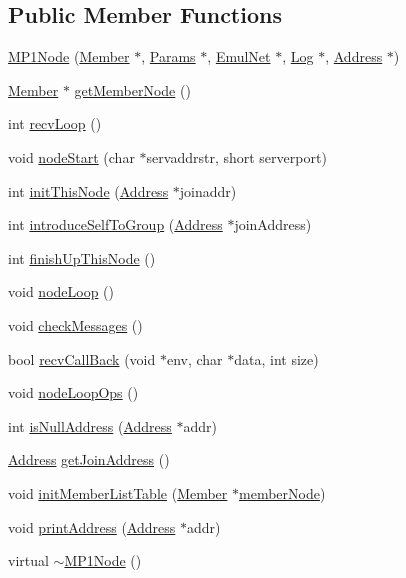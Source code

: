 \subsection*{\-Public \-Member \-Functions}
\begin{DoxyCompactItemize}
\item 
\hyperlink{class_m_p1_node_a7ee5f216f4d59ee4e80028f346a71e80}{\-M\-P1\-Node} (\hyperlink{class_member}{\-Member} $\ast$, \hyperlink{class_params}{\-Params} $\ast$, \hyperlink{class_emul_net}{\-Emul\-Net} $\ast$, \hyperlink{class_log}{\-Log} $\ast$, \hyperlink{class_address}{\-Address} $\ast$)
\item 
\hyperlink{class_member}{\-Member} $\ast$ \hyperlink{class_m_p1_node_acf056a183e4db1b8290ff736f8ced409}{get\-Member\-Node} ()
\item 
int \hyperlink{class_m_p1_node_a61c78c68e9033a5ff52c3fc2e1a3982b}{recv\-Loop} ()
\item 
void \hyperlink{class_m_p1_node_a432c95b8d9ff4d689bf6f670884639a8}{node\-Start} (char $\ast$servaddrstr, short serverport)
\item 
int \hyperlink{class_m_p1_node_ae2b5a0e2ffd68532ab68a1f17853cf6e}{init\-This\-Node} (\hyperlink{class_address}{\-Address} $\ast$joinaddr)
\item 
int \hyperlink{class_m_p1_node_ad020c60f48dec0571ce9a744540effbd}{introduce\-Self\-To\-Group} (\hyperlink{class_address}{\-Address} $\ast$join\-Address)
\item 
int \hyperlink{class_m_p1_node_a707677bbd17a3cf3d441f0ab08dab6b7}{finish\-Up\-This\-Node} ()
\item 
void \hyperlink{class_m_p1_node_a5580b634a7656f04db9d819d0b722712}{node\-Loop} ()
\item 
void \hyperlink{class_m_p1_node_a4fe0fab29863fb7de566e9361272d0ad}{check\-Messages} ()
\item 
bool \hyperlink{class_m_p1_node_ac04abd96cbe4d9c34cb9b1b775b82511}{recv\-Call\-Back} (void $\ast$env, char $\ast$data, int size)
\item 
void \hyperlink{class_m_p1_node_a1dcede441149fb1dc09b0ef9cf715ca8}{node\-Loop\-Ops} ()
\item 
int \hyperlink{class_m_p1_node_aa602659d4955d5656fac098d6caf43a9}{is\-Null\-Address} (\hyperlink{class_address}{\-Address} $\ast$addr)
\item 
\hyperlink{class_address}{\-Address} \hyperlink{class_m_p1_node_aaf969b40dbcd84f9cf71976463d397f2}{get\-Join\-Address} ()
\item 
void \hyperlink{class_m_p1_node_af86b48cb1dfa2ecfceb72c48f584e498}{init\-Member\-List\-Table} (\hyperlink{class_member}{\-Member} $\ast$\hyperlink{class_m_p1_node_a328d012a8827407b51ea765ee420b8a3}{member\-Node})
\item 
void \hyperlink{class_m_p1_node_a9d17887a03711ecab55cc0af4777985c}{print\-Address} (\hyperlink{class_address}{\-Address} $\ast$addr)
\item 
virtual \hyperlink{class_m_p1_node_aec6ac10280043ed4e078b9d9d2725eb9}{$\sim$\-M\-P1\-Node} ()
\end{DoxyCompactItemize}
